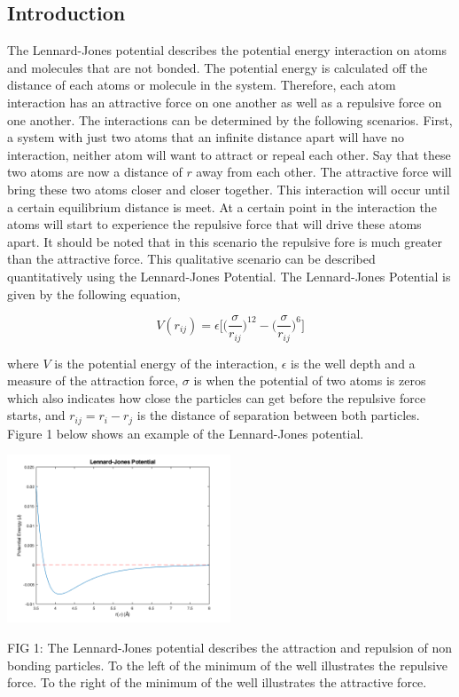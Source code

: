 \documentclass[reprint,amsmath,amssymb, aps, 10pt, a4paper, english, reqno]{revtex4-1}
\begin{document}

\begin{multicols}{2}
\section{\label{sec:level1}Introduction}


The Lennard-Jones potential describes the potential energy interaction on atoms and molecules that are not bonded. The potential energy is calculated off the distance of each atoms or molecule in the system. Therefore, each atom interaction has an attractive force on one another as well as a repulsive force on one another. The interactions can be determined by the following scenarios. First, a system with just two atoms that an infinite distance apart will have no interaction, neither atom will want to attract or repeal each other. Say that these two atoms are now a distance of $r$ away from each other. The attractive force will bring these two atoms closer and closer together. This interaction will occur until a certain equilibrium distance is meet. At a certain point in the interaction the atoms will start to experience the repulsive force that will drive these atoms apart. It should be noted that in this scenario the repulsive fore is much greater than the attractive force. This qualitative scenario can be described quantitatively using the Lennard-Jones Potential. The Lennard-Jones Potential is given by the following equation, 

\begin{equation}
    V(r_{ij}) = \epsilon\Bigg[\Bigg(\frac{\sigma}{r_{ij}}\Bigg)^{12} - \Bigg(\frac{\sigma}{r_{ij}}\Bigg)^{6}\Bigg]
\end{equation}

where $V$ is the potential energy of the interaction, $\epsilon$ is the well depth and a measure of the attraction force, $\sigma$ is when the potential of two atoms is zeros which also indicates how close the particles can get before the repulsive force starts, and $r_{ij} = r_{i} - r_{j}$ is the distance of separation between both particles. Figure 1 below shows an example of the Lennard-Jones potential. 



\begin{center}
    \includegraphics[width=0.50\textwidth]{lennard_jones_potential.png}
    \caption{\small FIG 1: The Lennard-Jones potential describes the attraction and repulsion of non bonding particles. To the left of the minimum of the well illustrates the repulsive force. To the right of the minimum of the well illustrates the attractive force.}
\end{center}


\end{multicols}
\end{document}
